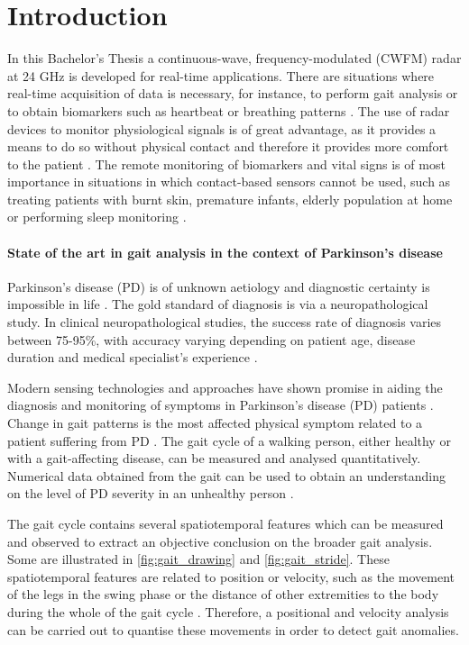 \chapter{Introduction} \label{cha:intro}

	In this Bachelor's Thesis a continuous-wave, frequency-modulated (CWFM) radar at 24 GHz is developed for real-time applications. There are situations where real-time acquisition of data is necessary, for instance, to perform gait analysis \cite{Liu2022} or to obtain biomarkers such as heartbeat or breathing patterns \cite{Antolinos2020}. The use of radar devices to monitor physiological signals is of great advantage, as it provides a means to do so without physical contact and therefore it provides more comfort to the patient \cite{Saner2020}. The remote monitoring of biomarkers and vital signs is of most importance in situations in which contact-based sensors cannot be used, such as treating patients with burnt skin, premature infants, elderly population at home or performing sleep monitoring \cite{BoricLubecke2016}.
	
	\subsubsection{State of the art in gait analysis in the context of Parkinson's disease} \label{sec:gait_analysis}
	
	Parkinson's disease (PD) is of unknown aetiology and diagnostic certainty is impossible in life \cite{Balestrino2019}. The gold standard of diagnosis is via a neuropathological study. In clinical neuropathological studies, the success rate of diagnosis varies between 75-95\%, with accuracy varying depending on patient age, disease duration and medical specialist's experience \cite{Balestrino2019}.
	
	Modern sensing technologies and approaches have shown promise in aiding the diagnosis and monitoring of symptoms in Parkinson's disease (PD) patients \cite{Biase2020}. Change in gait patterns is the most affected physical symptom related to a patient suffering from PD \cite{Zanardi2021}. The gait cycle of a walking person, either healthy or with a gait-affecting disease, can be measured and analysed quantitatively. Numerical data obtained from the gait can be used to obtain an understanding on the level of PD severity in an unhealthy person \cite{Zanardi2021}.
	
	The gait cycle contains several spatiotemporal features which can be measured and observed to extract an objective conclusion on the broader gait analysis. Some are illustrated in \cref{fig:gait_drawing} and \cref{fig:gait_stride}. These spatiotemporal features are related to position or velocity, such as the movement of the legs in the swing phase or the distance of other extremities to the body during the whole of the gait cycle \cite{Biase2020}. Therefore, a positional and velocity analysis can be carried out to quantise these movements in order to detect gait anomalies.
	
